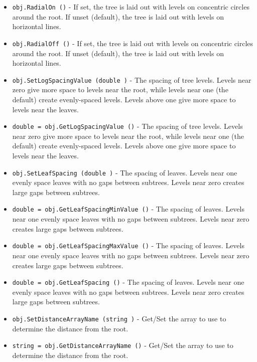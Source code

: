 \begin{itemize}
\item  \verb|obj.RadialOn ()| -  If set, the tree is laid out with levels on concentric circles 
 around the root. If unset (default), the tree is laid out with 
 levels on horizontal lines.

\item  \verb|obj.RadialOff ()| -  If set, the tree is laid out with levels on concentric circles 
 around the root. If unset (default), the tree is laid out with 
 levels on horizontal lines.

\item  \verb|obj.SetLogSpacingValue (double )| -  The spacing of tree levels. Levels near zero give more space
 to levels near the root, while levels near one (the default)
 create evenly-spaced levels. Levels above one give more space
 to levels near the leaves.

\item  \verb|double = obj.GetLogSpacingValue ()| -  The spacing of tree levels. Levels near zero give more space
 to levels near the root, while levels near one (the default)
 create evenly-spaced levels. Levels above one give more space
 to levels near the leaves.

\item  \verb|obj.SetLeafSpacing (double )| -  The spacing of leaves.  Levels near one evenly space leaves
 with no gaps between subtrees.  Levels near zero creates
 large gaps between subtrees.

\item  \verb|double = obj.GetLeafSpacingMinValue ()| -  The spacing of leaves.  Levels near one evenly space leaves
 with no gaps between subtrees.  Levels near zero creates
 large gaps between subtrees.

\item  \verb|double = obj.GetLeafSpacingMaxValue ()| -  The spacing of leaves.  Levels near one evenly space leaves
 with no gaps between subtrees.  Levels near zero creates
 large gaps between subtrees.

\item  \verb|double = obj.GetLeafSpacing ()| -  The spacing of leaves.  Levels near one evenly space leaves
 with no gaps between subtrees.  Levels near zero creates
 large gaps between subtrees.

\item  \verb|obj.SetDistanceArrayName (string )| -  Get/Set the array to use to determine the distance from the
 root.

\item  \verb|string = obj.GetDistanceArrayName ()| -  Get/Set the array to use to determine the distance from the
 root.

\end{itemize}

